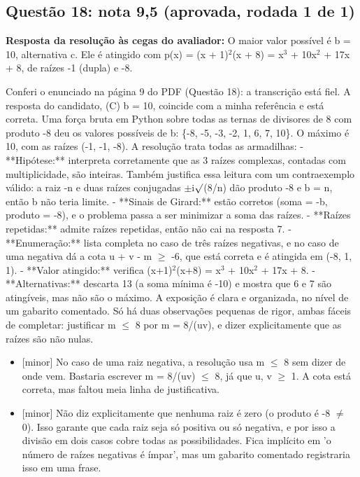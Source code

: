 \documentclass{article}%
\begin{document}
\subsection*{Questão 18: nota 9,5 (aprovada, rodada 1 de 1)}%
\textbf{Resposta da resolução às cegas do avaliador:} O maior valor possível é b = 10, alternativa c. Ele é atingido com p(x) = (x + 1)$^2$(x + 8) = x$^3$ + 10x$^2$ + 17x + 8, de raízes -1 (dupla) e -8.\par %
Conferi o enunciado na página 9 do PDF (Questão 18): a transcrição está fiel. A resposta do candidato, (C) b = 10, coincide com a minha referência e está correta. Uma força bruta em Python sobre todas as ternas de divisores de 8 com produto -8 deu os valores possíveis de b: \{-8, -5, -3, -2, 1, 6, 7, 10\}. O máximo é 10, com as raízes (-1, -1, -8).\newline%
\newline%
A resolução trata todas as armadilhas:\newline%
{-} **Hipótese:** interpreta corretamente que as 3 raízes complexas, contadas com multiplicidade, são inteiras. Também justifica essa leitura com um contraexemplo válido: a raiz -n e duas raízes conjugadas $\pm$i$\surd$(8/n) dão produto -8 e b = n, então b não teria limite.\newline%
{-} **Sinais de Girard:** estão corretos (soma = -b, produto = -8), e o problema passa a ser minimizar a soma das raízes.\newline%
{-} **Raízes repetidas:** admite raízes repetidas, então não cai na resposta 7.\newline%
{-} **Enumeração:** lista completa no caso de três raízes negativas, e no caso de uma negativa dá a cota u + v - m $\geq$ -6, que está correta e é atingida em (-8, 1, 1).\newline%
{-} **Valor atingido:** verifica (x+1)$^2$(x+8) = x$^3$ + 10x$^2$ + 17x + 8.\newline%
{-} **Alternativas:** descarta 13 (a soma mínima é -10) e mostra que 6 e 7 são atingíveis, mas não são o máximo.\newline%
\newline%
A exposição é clara e organizada, no nível de um gabarito comentado. Só há duas observações pequenas de rigor, ambas fáceis de completar: justificar m $\leq$ 8 por m = 8/(uv), e dizer explicitamente que as raízes são não nulas.%
\begin{itemize}%
\item%
{[}minor{]} No caso de uma raiz negativa, a resolução usa m $\leq$ 8 sem dizer de onde vem. Bastaria escrever m = 8/(uv) $\leq$ 8, já que u, v $\geq$ 1. A cota está correta, mas faltou meia linha de justificativa.%
\item%
{[}minor{]} Não diz explicitamente que nenhuma raiz é zero (o produto é -8 $\neq$ 0). Isso garante que cada raiz seja só positiva ou só negativa, e por isso a divisão em dois casos cobre todas as possibilidades. Fica implícito em 'o número de raízes negativas é ímpar', mas um gabarito comentado registraria isso em uma frase.%
\end{itemize}%
\end{document}
